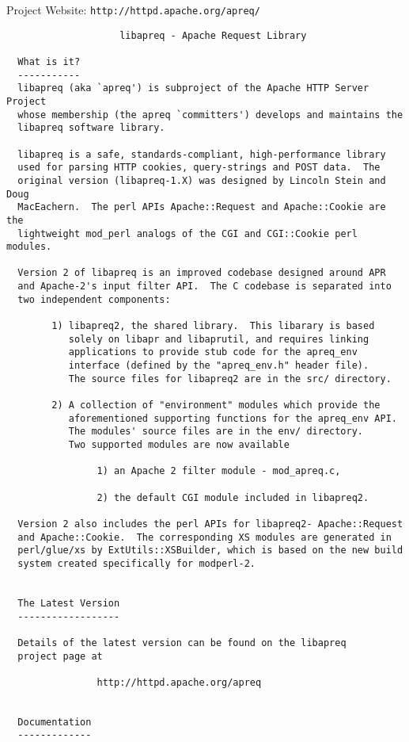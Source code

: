  Project Website: {\tt http://httpd.apache.org/apreq/} 

\footnotesize\begin{verbatim}
                    libapreq - Apache Request Library

  What is it?
  -----------
  libapreq (aka `apreq') is subproject of the Apache HTTP Server Project 
  whose membership (the apreq `committers') develops and maintains the 
  libapreq software library.

  libapreq is a safe, standards-compliant, high-performance library 
  used for parsing HTTP cookies, query-strings and POST data.  The 
  original version (libapreq-1.X) was designed by Lincoln Stein and Doug 
  MacEachern.  The perl APIs Apache::Request and Apache::Cookie are the
  lightweight mod_perl analogs of the CGI and CGI::Cookie perl modules.

  Version 2 of libapreq is an improved codebase designed around APR
  and Apache-2's input filter API.  The C codebase is separated into
  two independent components:

        1) libapreq2, the shared library.  This libarary is based 
           solely on libapr and libaprutil, and requires linking
           applications to provide stub code for the apreq_env
           interface (defined by the "apreq_env.h" header file).
           The source files for libapreq2 are in the src/ directory.

        2) A collection of "environment" modules which provide the
           aforementioned supporting functions for the apreq_env API.
           The modules' source files are in the env/ directory.
           Two supported modules are now available

                1) an Apache 2 filter module - mod_apreq.c,

                2) the default CGI module included in libapreq2.

  Version 2 also includes the perl APIs for libapreq2- Apache::Request 
  and Apache::Cookie.  The corresponding XS modules are generated in
  perl/glue/xs by ExtUtils::XSBuilder, which is based on the new build 
  system created specifically for modperl-2.


  The Latest Version
  ------------------

  Details of the latest version can be found on the libapreq
  project page at 

                http://httpd.apache.org/apreq


  Documentation
  -------------


\end{verbatim}

